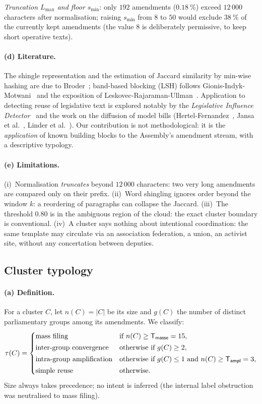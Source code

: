 \emph{Truncation $L_{\max}$ and floor $s_{\min}$}: only $192$ amendments
($0.18~\%$) exceed $12\,000$ characters after normalisation; raising $s_{\min}$
from $8$ to $50$ would exclude $38~\%$ of the currently kept amendments (the value
$8$ is deliberately permissive, to keep short operative texts).

\paragraph{(d) Literature.} The shingle representation and the estimation of
Jaccard similarity by min-wise hashing are due to Broder~\cite{broder1997,broder2000};
band-based blocking (LSH) follows Gionis-Indyk-Motwani~\cite{gionis1999} and the
exposition of Leskovec-Rajaraman-Ullman~\cite{lru2014}. Application to detecting
reuse of legislative text is explored notably by the \emph{Legislative Influence
Detector}~\cite{burgess2016} and the work on the diffusion of \og{}model
bills\fg{} (Hertel-Fernandez~\cite{hf2014}, Jansa et al.~\cite{jansa2019},
Linder et al.~\cite{linder2020}). Our contribution is not methodological: it is
the \emph{application} of known building blocks to the Assembly's amendment stream,
with a descriptive typology.

\paragraph{(e) Limitations.} (i)~Normalisation \emph{truncates} beyond $12\,000$
characters: two very long amendments are compared only on their prefix.
(ii)~Word shingling ignores order beyond the window $k$: a reordering of
paragraphs can collapse the Jaccard. (iii)~The threshold $0.80$ is in the
ambiguous region of the cloud: the exact cluster boundary is conventional.
(iv)~A \og{}cluster\fg{} says nothing about intentional coordination: the same
template may circulate via an association federation, a union, an activist site,
without any concertation between deputies.

\subsection{Cluster typology}\label{sec:typo-en}

\paragraph{(a) Definition.} For a cluster $C$, let $n(C)=|C|$ be its size and
$g(C)$ the number of distinct parliamentary groups among its amendments. We
classify:
\[
\tau(C)=\begin{cases}
\text{mass filing} & \text{if } n(C)\ge \mathsf{T_{masse}}=15,\\[2pt]
\text{inter-group convergence} & \text{otherwise if } g(C)\ge 2,\\[2pt]
\text{intra-group amplification} & \text{otherwise if } g(C)\le 1 \text{ and } n(C)\ge \mathsf{T_{ampl}}=3,\\[2pt]
\text{simple reuse} & \text{otherwise.}
\end{cases}
\]
Size always takes precedence; no intent is inferred (the internal label
\og{}obstruction\fg{} was neutralised to \og{}mass filing\fg{}).

